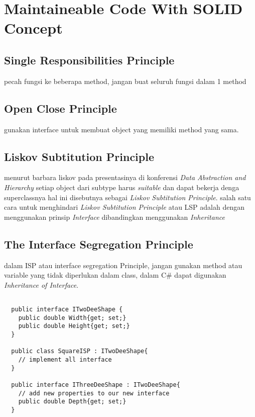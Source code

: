 

\graphicspath{{./img/}}

\section{Maintaineable Code With SOLID Concept}

\subsection{Single Responsibilities Principle}
pecah fungsi ke beberapa method, jangan buat seluruh fungsi dalam 1 method





\subsection{Open Close Principle}
gunakan interface untuk membuat object yang memiliki method yang sama. 

\subsection{Liskov Subtitution Principle}
menurut barbara liskov pada presentasinya di konferensi \textit{Data Abstraction and Hierarchy}
setiap object dari subtype harus \textit{suitable} dan dapat bekerja denga superclassnya
hal ini disebutnya sebagai \textit{Liskov Subtitution Principle}. 
salah satu cara untuk menghindari \textit{Liskov Subtitution Principle} atau LSP
adalah dengan menggunakan prinsip \textit{Interface} dibandingkan menggunakan \textit{Inheritance}

\subsection{The Interface Segregation Principle}
dalam ISP atau interface segregation Principle, jangan gunakan method atau variable yang tidak diperlukan dalam class, 
dalam C\# dapat digunakan \textit{Inheritance of Interface}.

\begin{lstlisting}

  public interface ITwoDeeShape {
    public double Width{get; set;}
    public double Height{get; set;}
  }

  public class SquareISP : ITwoDeeShape{
    // implement all interface 
  }

  public interface IThreeDeeShape : ITwoDeeShape{
    // add new properties to our new interface
    public double Depth{get; set;}
  }

\end{lstlisting}


